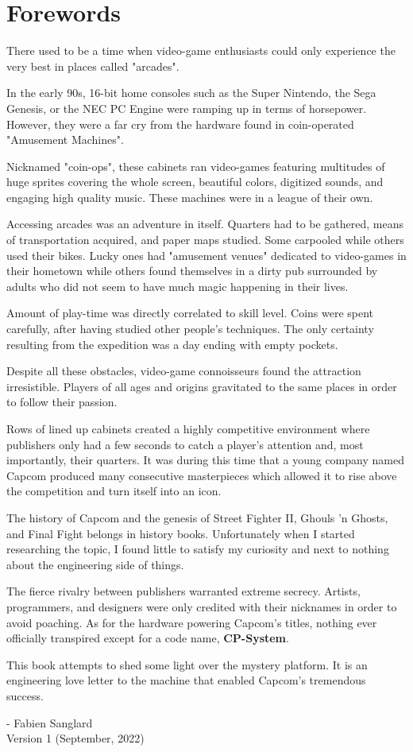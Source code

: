 \chapter*{Forewords}

There used to be a time when video-game enthusiasts could only experience the very best in places called "arcades". 

In the early 90s, 16-bit home consoles such as the Super Nintendo, the Sega Genesis, or the NEC PC Engine were ramping up in terms of horsepower. However, they were a far cry from the hardware found in coin-operated "Amusement Machines".

Nicknamed "coin-ops", these cabinets ran video-games featuring multitudes of huge sprites covering the whole screen, beautiful colors, digitized sounds, and engaging high quality music. These machines were in a league of their own.

Accessing arcades was an adventure in itself. Quarters had to be gathered, means of transportation acquired, and paper maps studied. Some carpooled while others used their bikes. Lucky ones had "amusement venues" dedicated to video-games in their hometown while others found themselves in a dirty pub surrounded by adults who did not seem to have much magic happening in their lives. 

Amount of play-time was directly correlated to skill level. Coins were spent carefully, after having studied other people's techniques. The only certainty resulting from the expedition was a day ending with empty pockets. 

Despite all these obstacles, video-game connoisseurs found the attraction irresistible. Players of all ages and origins gravitated to the same places in order to follow their passion. 

Rows of lined up cabinets created a highly competitive environment where publishers only had a few seconds to catch a player's attention and, most importantly, their quarters. It was during this time that a young company named Capcom produced many consecutive masterpieces which allowed it to rise above the competition and turn itself into an icon.

The history of Capcom and the genesis of Street Fighter II, Ghouls 'n Ghosts, and Final Fight belongs in history books. Unfortunately when I started researching the topic, I found little to satisfy my curiosity and next to nothing about the engineering side of things. 

The fierce rivalry between publishers warranted extreme secrecy. Artists, programmers, and designers were only credited with their nicknames in order to avoid poaching. As for the hardware powering Capcom's titles, nothing ever officially transpired except for a code name, \textbf{CP-System}.

This book attempts to shed some light over the mystery platform. It is an engineering love letter to the machine that enabled Capcom's tremendous success. 

- Fabien Sanglard\\
 Version 1 (September, 2022)
